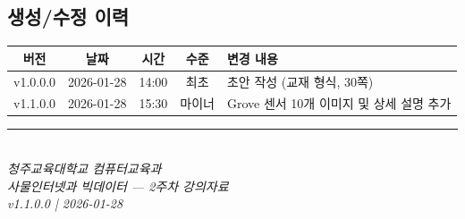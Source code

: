 \documentclass[11pt, a4paper]{article}
\begin{document}
\subsection*{생성/수정 이력}

\begin{table}[H]
\centering
\begin{tabularx}{\textwidth}{|c|c|c|c|X|}
\hline
\rowcolor{lightgray}
\textbf{버전} & \textbf{날짜} & \textbf{시간} & \textbf{수준} & \textbf{변경 내용} \\
\hline
v1.0.0.0 & 2026-01-28 & 14:00 & 최초 & 초안 작성 (교재 형식, 30쪽) \\
\hline
v1.1.0.0 & 2026-01-28 & 15:30 & 마이너 & Grove 센서 10개 이미지 및 상세 설명 추가 \\
\hline
\end{tabularx}
\end{table}

\vfill

\begin{center}
\rule{0.5\textwidth}{0.4pt}\\[0.5em]
\textit{청주교육대학교 컴퓨터교육과}\\
\textit{사물인터넷과 빅데이터 --- 2주차 강의자료}\\
\textit{v1.1.0.0 | 2026-01-28}
\end{center}
\end{document}
